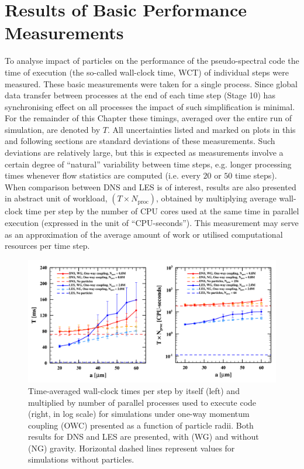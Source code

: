 \documentclass{pracamgren}
\begin{document}
\section{Results of Basic Performance Measurements}
\label{sc:ch3.perfs}

To analyse impact of particles on the performance of the pseudo-spectral code the time of execution (the so-called wall-clock time, WCT) of individual steps were measured.
These basic measurements were taken for a single process.
Since global data transfer between processes at the end of each time step (Stage 10) has synchronising effect on all processes the impact of such simplification is minimal.
For the remainder of this Chapter these timings, averaged over the entire run of simulation, are denoted by $T$.
All uncertainties listed and marked on plots in this and following sections are standard deviations of these measurements.
Such deviations are relatively large, but this is expected as measurements involve a certain degree of ``natural'' variability between time steps, e.g. longer processing times whenever flow statistics are computed (i.e. every $20$ or $50$ time steps).
When comparison between DNS and LES is of interest, results are also presented in abstract unit of workload, $(T \times N_{\text{proc}})$, obtained by multiplying average wall-clock time per step by the number of CPU cores used at the same time in parallel execution (expressed in the unit of ``CPU-seconds'').
This measurement may serve as an approximation of the average amount of work or utilised computational resources per time step.

\begin{figure}[ht]
\centering
\includegraphics[width=13.5cm]{figures/3-02_pfsowc.pdf}
\caption{
Time-averaged wall-clock times per step by itself (left) and multiplied by number of parallel processes used to execute code (right, in log scale) for simulations under one-way momentum coupling (OWC) presented as a function of particle radii.
Both results for DNS and LES are presented, with (WG) and without (NG) gravity.
Horizontal dashed lines represent values for simulations without particles.
}
\label{fig:pfsowc}
\end{figure}
\end{document}

